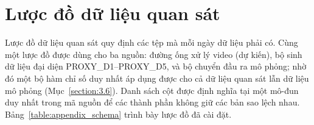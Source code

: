 \documentclass[../DoAn.tex]{subfiles}
\begin{document}
\section{Lược đồ dữ liệu quan sát}
\label{section:appendix_schema}

Lược đồ dữ liệu quan sát quy định các tệp mà mỗi ngày dữ liệu phải có. Cùng một lược đồ được dùng cho ba nguồn: đường ống xử lý video (dự kiến), bộ sinh dữ liệu đại diện PROXY\_D1--PROXY\_D5, và bộ chuyển đầu ra mô phỏng; nhờ đó một bộ hàm chỉ số duy nhất áp dụng được cho cả dữ liệu quan sát lẫn dữ liệu mô phỏng (Mục~\ref{section:3.6}). Danh sách cột được định nghĩa tại một mô-đun duy nhất trong mã nguồn để các thành phần không giữ các bản sao lệch nhau. Bảng~\ref{table:appendix_schema} trình bày lược đồ đã cài đặt.
\end{document}
